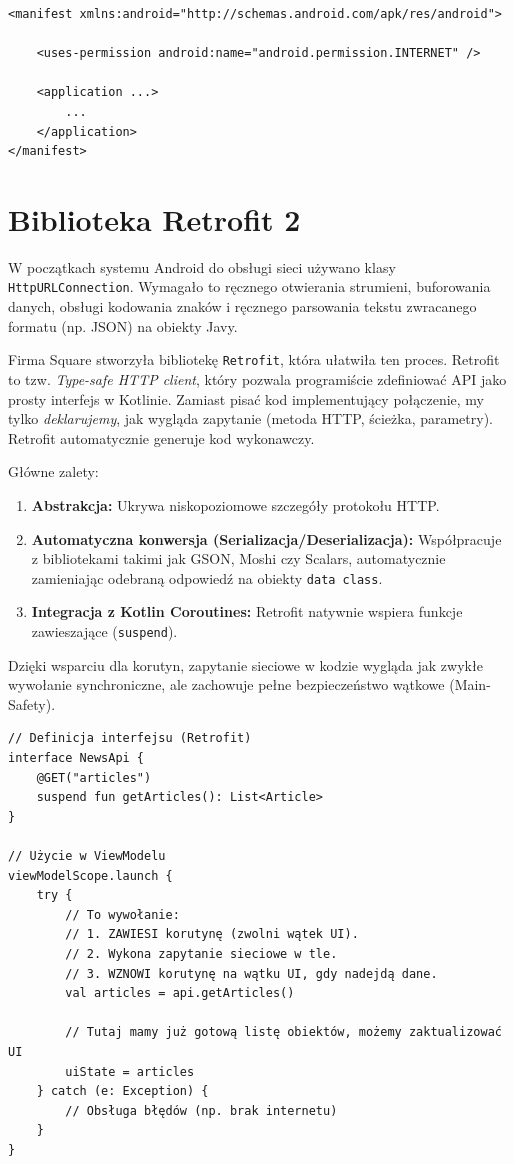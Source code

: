 \begin{verbatim}
<manifest xmlns:android="http://schemas.android.com/apk/res/android">

    <uses-permission android:name="android.permission.INTERNET" />

    <application ...>
        ...
    </application>
</manifest>
\end{verbatim}

\section{Biblioteka Retrofit 2}

W początkach systemu Android do obsługi sieci używano klasy \texttt{HttpURLConnection}. Wymagało to ręcznego otwierania strumieni, buforowania danych, obsługi kodowania znaków i ręcznego parsowania tekstu zwracanego formatu (np. JSON) na obiekty Javy.

Firma Square stworzyła bibliotekę \texttt{Retrofit}, która ułatwiła ten proces. Retrofit to tzw. \textit{Type-safe HTTP client}, który pozwala programiście zdefiniować API jako prosty interfejs w Kotlinie.
Zamiast pisać kod implementujący połączenie, my tylko \textit{deklarujemy}, jak wygląda zapytanie (metoda HTTP, ścieżka, parametry). Retrofit automatycznie generuje kod wykonawczy.

Główne zalety:
\begin{enumerate}
    \item \textbf{Abstrakcja:} Ukrywa niskopoziomowe szczegóły protokołu HTTP.
    \item \textbf{Automatyczna konwersja (Serializacja/Deserializacja):} Współpracuje z bibliotekami takimi jak GSON, Moshi czy Scalars, automatycznie zamieniając odebraną odpowiedź na obiekty \texttt{data class}.
    \item \textbf{Integracja z Kotlin Coroutines:} Retrofit natywnie wspiera funkcje zawieszające (\texttt{suspend}).
\end{enumerate}

Dzięki wsparciu dla korutyn, zapytanie sieciowe w kodzie wygląda jak zwykłe wywołanie synchroniczne, ale zachowuje pełne bezpieczeństwo wątkowe (Main-Safety).

\begin{verbatim}
// Definicja interfejsu (Retrofit)
interface NewsApi {
    @GET("articles")
    suspend fun getArticles(): List<Article>
}

// Użycie w ViewModelu
viewModelScope.launch {
    try {
        // To wywołanie:
        // 1. ZAWIESI korutynę (zwolni wątek UI).
        // 2. Wykona zapytanie sieciowe w tle.
        // 3. WZNOWI korutynę na wątku UI, gdy nadejdą dane.
        val articles = api.getArticles()
        
        // Tutaj mamy już gotową listę obiektów, możemy zaktualizować UI
        uiState = articles
    } catch (e: Exception) {
        // Obsługa błędów (np. brak internetu)
    }
}
\end{verbatim}

